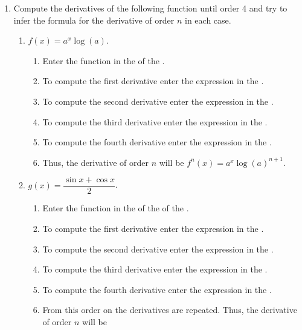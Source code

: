 \begin{enumerate}[leftmargin=*]
\item Compute the derivatives of the following function until order 4 and try to infer the formula for the derivative of order $n$ in each case.
      \begin{enumerate}
      \item  $f(x)=a^x\log(a)$.
            \begin{indication}
            \begin{enumerate}
            \item Enter the function  in the  of the .
            \item To compute the first derivative enter the expression  in the .
            \item To compute the second derivative enter the expression  in the .
            \item To compute the third derivative enter the expression  in the .
            \item To compute the fourth derivative enter the expression  in the .
            \item Thus, the derivative of order $n$ will be $f^n(x)=a^x\log(a)^{n+1}$.
            \end{enumerate}
            \end{indication}
      \item  $g(x)=\dfrac{\sin x +\cos x}{2}$.
            \begin{indication}
            \begin{enumerate}
            \item Enter the function  in the  of the  of the .
            \item To compute the first derivative enter the expression  in the .
            \item To compute the second derivative enter the expression  in the .
            \item To compute the third derivative enter the expression  in the .
            \item To compute the fourth derivative enter the expression  in the .
            \item From this order on the derivatives are repeated. Thus, the derivative of order $n$ will be

\end{enumerate}
\end{indication}
\end{enumerate}
\end{enumerate}
